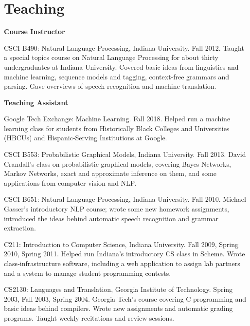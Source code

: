 \section*{Teaching}
\begin{itemize*}

\item{\textbf{Course Instructor}}
\begin{itemize*}
\item CSCI B490: Natural Language Processing, Indiana University. Fall 2012.
Taught a special topics course on Natural Language Processing for about thirty
undergraduates at Indiana University. Covered basic ideas from linguistics and
machine learning, sequence models and tagging, context-free grammars and
parsing. Gave overviews of speech recognition and machine translation.
\end{itemize*}

\item{\textbf{Teaching Assistant}}
\begin{itemize*}
\item Google Tech Exchange: Machine Learning. Fall 2018.
Helped run a machine learning class for students from Historically Black
Colleges and Universities (HBCUs) and Hispanic-Serving Institutions at Google.

\item CSCI B553: Probabilistic Graphical Models, Indiana University. Fall 2013.
David Crandall's class on probabilistic graphical models, covering Bayes
Networks, Markov Networks, exact and approximate inference on them, and some
applications from computer vision and NLP.

\item CSCI B651: Natural Language Processing, Indiana University. Fall 2010.
Michael Gasser's introductory NLP course; wrote some new homework assignments,
introduced the ideas behind automatic speech recognition and grammar
extraction.

\item C211: Introduction to Computer Science, Indiana University.
Fall 2009, Spring 2010, Spring 2011.
Helped run Indiana's introductory CS class in Scheme. Wrote
class-infrastructure software, including a web application to assign lab
partners and a system to manage student programming contests.

\item CS2130: Languages and Translation, Georgia Institute of Technology.
Spring 2003, Fall 2003, Spring 2004.  Georgia Tech's course covering C
programming and basic ideas behind compilers.  Wrote new assignments and
automatic grading programs.  Taught weekly recitations and review sessions.
\end{itemize*}


\end{itemize*}
